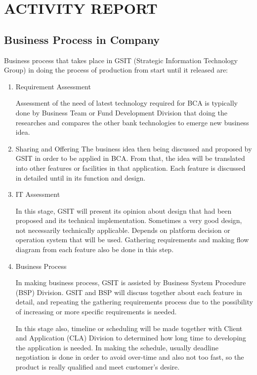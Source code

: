 \chapter{ACTIVITY REPORT}
\section{Business Process in Company}
Business process that takes place in GSIT (Strategic Information Technology Group) in doing the process of production from start until it released are:
\begin{enumerate}
\item Requirement Assessment

Assessment of the need of latest technology required for BCA is typically done by Business Team or Fund Development Division  that doing the researches and compares the other bank technologies to emerge new business idea.

\item Sharing and Offering
The business idea then being discussed and proposed by GSIT in order to be applied in BCA. From that, the idea will be translated into other features or facilities in that application. Each feature is discussed in detailed until in its function and design.

\item IT Assessment

In this stage, GSIT will present its opinion about design that had been proposed and its technical implementation. Sometimes a very good design, not necessarily technically applicable. Depends on platform decision or operation system that will be used. Gathering requirements and making flow diagram from each feature also be done in this step.

\item Business Process

In making business process, GSIT is assisted by Business System Procedure (BSP) Division. GSIT and BSP will discuss together about each feature in detail, and repeating the gathering requirements process due to the possibility of increasing or more specific requirements is needed.

In this stage also, timeline or scheduling will be made together with Client and Application (CLA) Division to determined how long time to developing the application is needed. In making the schedule, usually deadline negotiation  is done in order to avoid over-time and also not too fast, so the product is really qualified and meet customer's desire.


\end{enumerate}
